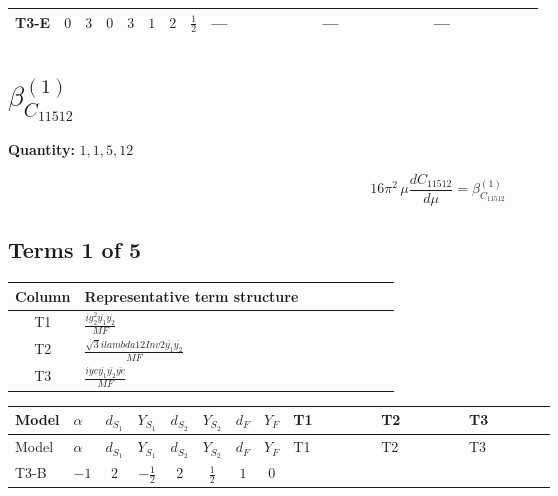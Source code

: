 \documentclass[8pt]{article}
\begin{document}
\begin{landscape}
\begin{longtable}{@{}llcccccc >{\raggedright\arraybackslash}p{0.21\linewidth} >{\raggedright\arraybackslash}p{0.21\linewidth} >{\raggedright\arraybackslash}p{0.21\linewidth}@{}}
\midrule
T3-E & $0$ & $3$ & $0$ & $3$ & $1$ & $2$ & $\frac{1}{2}$ & --- & --- & --- \\
\midrule
\bottomrule
\end{longtable}
\clearpage
\section*{$\beta_{C_{11512}}^{(1)}$}
\noindent\textbf{Quantity: }$\mathrm{1,1,5,12}$\par\smallskip
\[16\pi^2\,\mu\frac{d C_{11512}}{d\mu}=\beta_{C_{11512}}^{(1)}\]
\subsection*{Terms 1 of 5}
\begin{center}
\begin{tabular}{@{}c >{\raggedright\arraybackslash}p{0.82\linewidth}@{}}
\toprule
Column & Representative term structure \\
\midrule
T1 & \(\displaystyle \frac{i g_{2}^{2} \overline{y_{1}} \overline{y_{2}}}{MF}\) \\
\midrule
T2 & \(\displaystyle \frac{\sqrt{3} i lambda12Inv2 \overline{y_{1}} \overline{y_{2}}}{MF}\) \\
\midrule
T3 & \(\displaystyle \frac{i ye \overline{y_{1}} \overline{y_{2}} \overline{ye}}{MF}\) \\
\midrule
\bottomrule
\end{tabular}
\end{center}
\smallskip
\tiny
\begin{longtable}{@{}llcccccc >{\raggedright\arraybackslash}p{0.21\linewidth} >{\raggedright\arraybackslash}p{0.21\linewidth} >{\raggedright\arraybackslash}p{0.21\linewidth}@{}}
\toprule
Model & $\alpha$ & $d_{S_1}$ & $Y_{S_1}$ & $d_{S_2}$ & $Y_{S_2}$ & $d_F$ & $Y_F$ & T1 & T2 & T3 \\
\midrule
\endfirsthead
\toprule
Model & $\alpha$ & $d_{S_1}$ & $Y_{S_1}$ & $d_{S_2}$ & $Y_{S_2}$ & $d_F$ & $Y_F$ & T1 & T2 & T3 \\
\midrule
\endhead
T3-B & $-1$ & $2$ & $-\frac{1}{2}$ & $2$ & $\frac{1}{2}$ & $1$ & $0$ & \scriptsize\adjustbox{max width=\linewidth}{$\begin{gathered} - \frac{3 i g_{2}^{2} \overline{y_{1}} \overline{y_{2}}}{4 MF}\end{gathered}$} & \scriptsize\adjustbox{max width=\linewidth}{$\begin{gathered} - \frac{\sqrt{3} i lambda12Inv2 \overline{y_{1}} \overline{y_{2}}}{3 MF}\end{gathered}$} & \scriptsize\adjustbox{max width=\linewidth}{$\begin{gathered} \frac{i ye \overline{y_{1}} \overline{y_{2}} \overline{ye}}{4 MF}\end{gathered}$} \\

\end{longtable}
\end{landscape}
\end{document}
